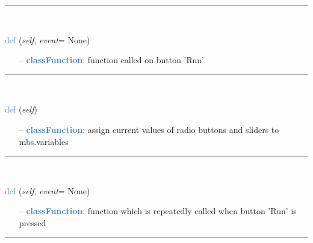 \begin{itemize}[leftmargin=1.4cm]
\begin{itemize}[leftmargin=1.4cm]
\begin{itemize}[leftmargin=0.5cm]
\begin{itemize}[leftmargin=1.4cm]
\begin{itemize}[leftmargin=1.4cm]
\begin{itemize}[leftmargin=0.5cm]
\begin{itemize}[leftmargin=1.4cm]
\begin{itemize}[leftmargin=0.5cm]
\begin{itemize}[leftmargin=1.4cm]
\begin{itemize}[leftmargin=1.4cm]
%
\noindent\rule{8cm}{0.75pt}\vspace{1pt} \\ 
\begin{flushleft}
\noindent \textcolor{steelblue}{def {\bf {}}}\label{sec:interactive:InteractiveDialog:StartSimulation}
({\it self}, {\it event}= None)
\end{flushleft}
\setlength{\itemindent}{0.7cm}
\begin{itemize}[leftmargin=0.7cm]
  \item[--]  \textcolor{steelblue}{\bf classFunction}: function called on button 'Run'\vspace{12pt}\end{itemize}
%
\noindent\rule{8cm}{0.75pt}\vspace{1pt} \\ 
\begin{flushleft}
\noindent \textcolor{steelblue}{def {\bf {}}}\label{sec:interactive:InteractiveDialog:ProcessWidgetStates}
({\it self})
\end{flushleft}
\setlength{\itemindent}{0.7cm}
\begin{itemize}[leftmargin=0.7cm]
  \item[--]  \textcolor{steelblue}{\bf classFunction}: assign current values of radio buttons and sliders to mbs.variables\vspace{12pt}\end{itemize}
%
\noindent\rule{8cm}{0.75pt}\vspace{1pt} \\ 
\begin{flushleft}
\noindent \textcolor{steelblue}{def {\bf {}}}\label{sec:interactive:InteractiveDialog:ContinuousRunFunction}
({\it self}, {\it event}= None)
\end{flushleft}
\setlength{\itemindent}{0.7cm}
\begin{itemize}[leftmargin=0.7cm]
  \item[--]  \textcolor{steelblue}{\bf classFunction}: function which is repeatedly called when button 'Run' is pressed\vspace{12pt}\end{itemize}
%
\noindent\rule{8cm}{0.75pt}\vspace{1pt} \\ 

\end{itemize}
\end{itemize}
\end{itemize}
\end{itemize}
\end{itemize}
\end{itemize}
\end{itemize}
\end{itemize}
\end{itemize}
\end{itemize}
